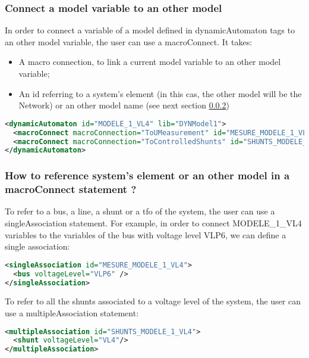 \documentclass[a4paper, 12pt]{report}
\begin{document}
\subsubsection{Connect a model variable to an other model}

In order to connect a variable of a model defined in dynamicAutomaton tags to an other model variable, the user can use a macroConnect. It takes:
\begin{itemize}
  \item A macro connection, to link a current model variable to an other model variable;
  \item An id referring to a system's element (in this cas, the other model will be the Network) or an other model name (see next section \ref{Node_Or_Model_Reference_On_Macro_Connect})
\end{itemize}

\begin{lstlisting}[language=XML, morekeywords={macroConnect}]
<dynamicAutomaton id="MODELE_1_VL4" lib="DYNModel1">
  <macroConnect macroConnection="ToUMeasurement" id="MESURE_MODELE_1_VL4"/>
  <macroConnect macroConnection="ToControlledShunts" id="SHUNTS_MODELE_1_VL4"/>
</dynamicAutomaton>
\end{lstlisting}

\subsubsection{How to reference system's element or an other model in a macroConnect statement ?}
\label{Node_Or_Model_Reference_On_Macro_Connect}

To refer to a bus, a line, a shunt or a tfo of the system, the user can use a singleAssociation statement. For example, in order to connect MODELE\_1\_VL4 variables to the variables of
the bus with voltage level VLP6, we can define a single association:

\begin{lstlisting}[language=XML, morekeywords={singleAssociation}]
<singleAssociation id="MESURE_MODELE_1_VL4">
  <bus voltageLevel="VLP6" />
</singleAssociation>
\end{lstlisting}

To refer to all the shunts associated to a voltage level of the system, the user can use a multipleAssociation statement:

\begin{lstlisting}[language=XML, morekeywords={multipleAssociation}]
<multipleAssociation id="SHUNTS_MODELE_1_VL4">
  <shunt voltageLevel="VL4"/>
</multipleAssociation>
\end{lstlisting}
\end{document}
